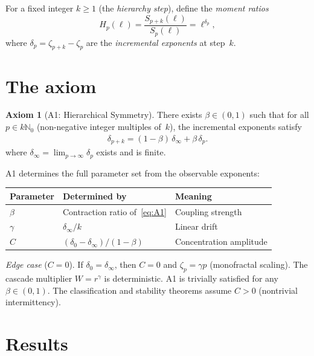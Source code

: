 \documentclass[12pt]{amsart}
\theoremstyle{definition}
\newtheorem*{axiom}{Axiom}
\theoremstyle{remark}
\begin{document}
For a fixed integer $k \geq 1$ (the \emph{hierarchy step}), define
the \emph{moment ratios}
\[
  H_p(\ell) = \frac{S_{p+k}(\ell)}{S_p(\ell)} = \ell^{\delta_p},
\]
where $\delta_p = \zeta_{p+k} - \zeta_p$ are the \emph{incremental
exponents} at step~$k$.


\section{The axiom}
\label{sec:axiom}

\begin{axiom}[A1: Hierarchical Symmetry]
There exists $\beta \in (0,1)$ such that for all $p \in k\mathbb{N}_0$
(non-negative integer multiples of~$k$), the incremental exponents
satisfy
\begin{align}\label{eq:A1}
  \delta_{p+k}
  = (1 - \beta)\,\delta_\infty + \beta\,\delta_p.
  \tag{$*$}
\end{align}
where $\delta_\infty = \lim_{p \to \infty} \delta_p$ exists and is
finite.
\end{axiom}

A1 determines the full parameter set from the observable exponents:
\begin{center}\small
\begin{tabular}{@{}lll@{}}
\toprule
Parameter & Determined by & Meaning \\
\midrule
$\beta$ & Contraction ratio of~\eqref{eq:A1} & Coupling strength \\
$\gamma$ & $\delta_\infty / k$ & Linear drift \\
$C$ & $(\delta_0 - \delta_\infty)/(1 - \beta)$ & Concentration amplitude \\
\bottomrule
\end{tabular}
\end{center}

\smallskip\noindent\textit{Edge case} ($C = 0$).  If $\delta_0 =
\delta_\infty$, then $C = 0$ and $\zeta_p = \gamma p$ (monofractal
scaling).  The cascade multiplier $W = r^\gamma$ is deterministic.
A1 is trivially satisfied for any $\beta \in (0,1)$.  The
classification and stability theorems assume $C > 0$ (nontrivial
intermittency).


\section{Results}
\label{sec:results}
\end{document}

